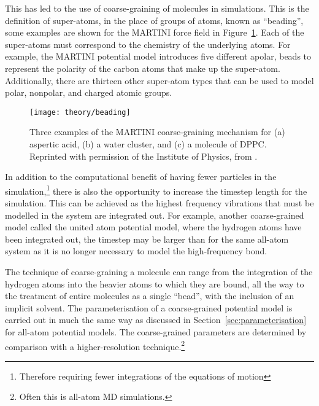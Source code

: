 This has led to the use of coarse-graining of molecules in simulations.
This is the definition of super-atoms, in the place of groups of atoms, known as ``beading'', some examples are shown for the MARTINI force field in Figure~\ref{fig:cg}.
Each of the super-atoms must correspond to the chemistry of the underlying atoms.
For example, the MARTINI potential model introduces five different apolar, beads to represent the polarity of the carbon atoms that make up the super-atom.
Additionally, there are thirteen other super-atom types that can be used to model polar, nonpolar, and charged atomic groups.
%
\begin{figure}[t]
    \forcerectofloat
    \centering
    \texttt{[image: theory/beading]}
    \caption{Three examples of the MARTINI coarse-graining mechanism for (a) aspertic acid, (b) a water cluster, and (c) a molecule of DPPC. Reprinted with permission of the Institute of Physics, from \cite{pluhackova_biomembranes_2015}.}
    \label{fig:cg}
\end{figure}
%

In addition to the computational benefit of having fewer particles in the simulation,\footnote{Therefore requiring fewer integrations of the equations of motion} there is also the opportunity to increase the timestep length for the simulation.
This can be achieved as the highest frequency vibrations that must be modelled in the system are integrated out.
For example, another coarse-grained model called the united atom potential model, where the hydrogen atoms have been integrated out, the timestep may be larger than for the same all-atom system as it is no longer necessary to model the high-frequency  bond.

The technique of coarse-graining a molecule can range from the integration of the hydrogen atoms into the heavier atoms to which they are bound, all the way to the treatment of entire molecules as a single ``bead'', with the inclusion of an implicit solvent.
The parameterisation of a coarse-grained potential model is carried out in much the same way as discussed in Section~\ref{sec:parameterisation} for all-atom potential models.
The coarse-grained parameters are determined by comparison with a higher-resolution technique.\footnote{Often this is all-atom MD simulations.}

